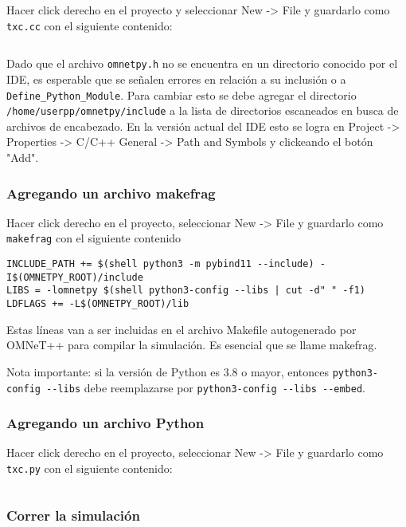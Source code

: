 \documentclass[]{article}
\begin{document}
Hacer click derecho en el proyecto y seleccionar New -> File y guardarlo como
\verb!txc.cc! con el siguiente contenido:

\inputminted{c++}{codelistings/tictoc.cc}

Dado que el archivo \verb!omnetpy.h! no se encuentra en un directorio conocido
por el IDE, es esperable que se señalen errores en relación a su inclusión o a
\verb!Define_Python_Module!. Para cambiar esto se debe agregar el directorio
\verb!/home/userpp/omnetpy/include! a la lista de directorios escaneados en
busca de archivos de encabezado. En la versión actual del IDE esto se logra en
Project -> Properties -> C/C++ General -> Path and Symbols y clickeando el
botón "Add".

\subsubsection{Agregando un archivo makefrag}

Hacer click derecho en el proyecto, seleccionar New -> File y guardarlo como
\verb!makefrag! con el siguiente contenido

\begin{verbatim}
INCLUDE_PATH += $(shell python3 -m pybind11 --include) -I$(OMNETPY_ROOT)/include
LIBS = -lomnetpy $(shell python3-config --libs | cut -d" " -f1)
LDFLAGS += -L$(OMNETPY_ROOT)/lib
\end{verbatim}

Estas líneas van a ser incluidas en el archivo Makefile autogenerado por
OMNeT++ para compilar la simulación. Es esencial que se llame makefrag.

Nota importante: si la versión de Python es 3.8 o mayor, entonces
\verb!python3-config --libs! debe reemplazarse por
\verb!python3-config --libs --embed!.

\subsubsection{Agregando un archivo Python}

Hacer click derecho en el proyecto, seleccionar New -> File y guardarlo como
\verb!txc.py! con el siguiente contenido:

\inputminted{Python}{codelistings/tictoc.py}

\subsubsection{Correr la simulación}
\end{document}
